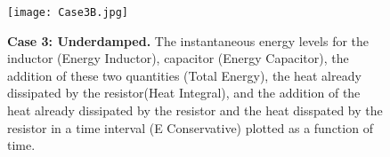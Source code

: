 \documentclass[twocolumn, letterpaper, 10pt, twoside]{article}
\begin{document}
{\begin{figure}[H]
	\centering
	\texttt{[image: Case3B.jpg]}
	\captionsetup{width=.8\linewidth,belowskip=-2mm,aboveskip=1mm}
	\vspace{0.2cm}
	\caption{\textbf{Case 3: Underdamped.} The instantaneous energy levels for the inductor (Energy Inductor), capacitor (Energy Capacitor), the addition of these two quantities (Total Energy), the heat already dissipated by the resistor(Heat Integral), and the addition of the heat already dissipated by the resistor and the heat disspated by the resistor in a time interval (E Conservative) plotted as a function of time.}
\end{figure}
}
\end{document}
